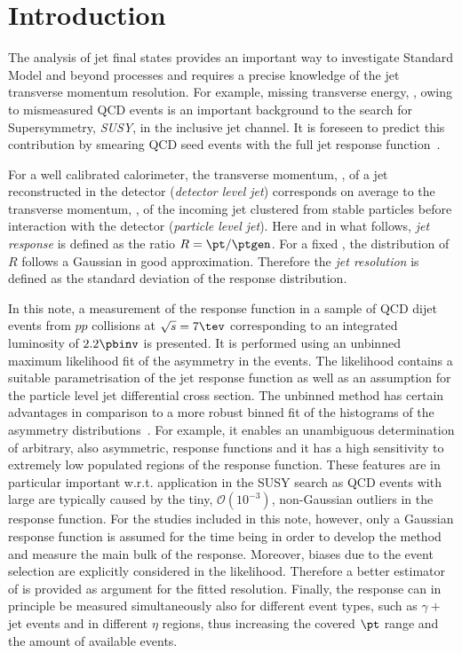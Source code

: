 

\section{Introduction}

The analysis of jet final states provides an important way to investigate Standard Model and beyond processes and requires a precise knowledge of the jet transverse momentum resolution.
For example, missing transverse energy, \met, owing to mismeasured QCD events is an important background to the search for Supersymmetry, \textit{SUSY}, in the inclusive jet channel.
It is foreseen to predict this contribution by smearing QCD seed events with the full jet response function~\cite{bib:ra2}.

For a well calibrated calorimeter, the transverse momentum, \pt, of a jet reconstructed in the detector (\textit{detector level jet}) corresponds on average to the transverse momentum, \ptgen, of the incoming jet clustered from stable particles before interaction with the detector (\textit{particle level jet}).
Here and in what follows, \textit{jet \pt response} is defined as the ratio \mbox{$R = \pt/\ptgen$}.
For a fixed \ptgen, the distribution of $R$ follows a Gaussian in good approximation.
Therefore the \textit{jet \pt resolution} is defined as the standard deviation of the response distribution. 

In this note, a measurement of the response function in a sample of QCD dijet events from $pp$ collisions at \mbox{$\sqrt{s} = 7\tev$} corresponding to an integrated luminosity of $2.2\pbinv$ is presented.
It is performed using an unbinned maximum likelihood fit of the \pt asymmetry in the events.
The likelihood contains a suitable parametrisation of the jet \pt response function as well as an assumption for the particle level jet differential cross section.
The unbinned method has certain advantages in comparison to a more robust binned fit of the histograms of the asymmetry distributions~\cite{bib:asym}.
For example, it enables an unambiguous determination of arbitrary, also asymmetric, response functions and it has a high sensitivity to extremely low populated regions of the response function.
These features are in particular important w.r.t. application in the SUSY search as QCD events with large \met are typically caused by the tiny, $\mathcal{O}(10^{-3})$, non-Gaussian outliers in the response function.
For the studies included in this note, however, only a Gaussian response function is assumed for the time being in order to develop the method and measure the main bulk of the response.
Moreover, biases due to the event selection are explicitly considered in the likelihood.
Therefore a better estimator of \ptgen is provided as argument for the fitted resolution.
Finally, the response can in principle be measured simultaneously also for different event types, such as $\gamma+$jet events and in different $\eta$ regions, thus increasing the covered $\pt$ range and the amount of available events.

